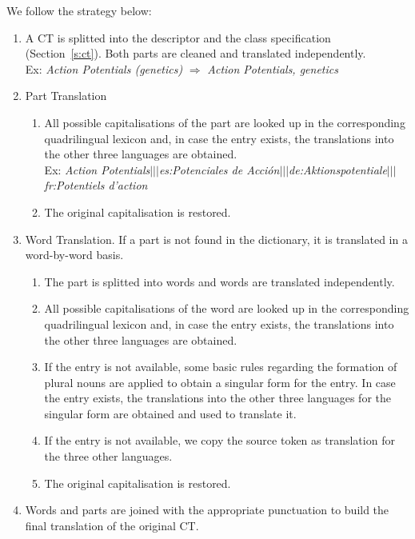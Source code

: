 \documentclass[a4paper,11pt]{article}
\begin{document}
\bigskip
\noindent
We follow the strategy below:
\begin{enumerate}
 \item A CT is splitted into the descriptor and the class specification (Section~\ref{s:ct}). Both parts are cleaned and translated independently. \\ 
       Ex: \emph{Action Potentials (genetics)} $\Rightarrow$ \emph{Action Potentials, genetics}
 \item Part Translation
      \begin{enumerate}[label*=\arabic*.]
      \item  All possible capitalisations of the part are looked up in the corresponding quadrilingual lexicon and, in case the entry exists, the translations into the other three languages are obtained.\\ 
       Ex: \emph{Action Potentials$|||$es:Potenciales de Acción$|||$de:Aktionspotentiale$|||$fr:Potentiels d'action}
      \item The original capitalisation is restored.
      \end{enumerate}

 \item Word Translation. If a part is not found in the dictionary, it is translated in a word-by-word basis.
      \begin{enumerate}[label*=\arabic*.]
	\item The part is splitted into words and words are translated independently.  
	\item  All possible capitalisations of the word are looked up in the corresponding quadrilingual lexicon and, in case the entry exists, the translations into the other three languages are obtained.
	\item If the entry is not available, some basic rules regarding the formation of plural nouns are applied to obtain a singular form for the entry. In case the entry exists, the translations into the other three languages for the singular form are obtained and used to translate it.
	\item If the entry is not available, we copy the source token as translation for the three other languages.
	\item The original capitalisation is restored.
      \end{enumerate}
     
  \item Words and parts are joined with the appropriate punctuation to build the final translation of the original CT.
     
\end{enumerate}
\end{document}
